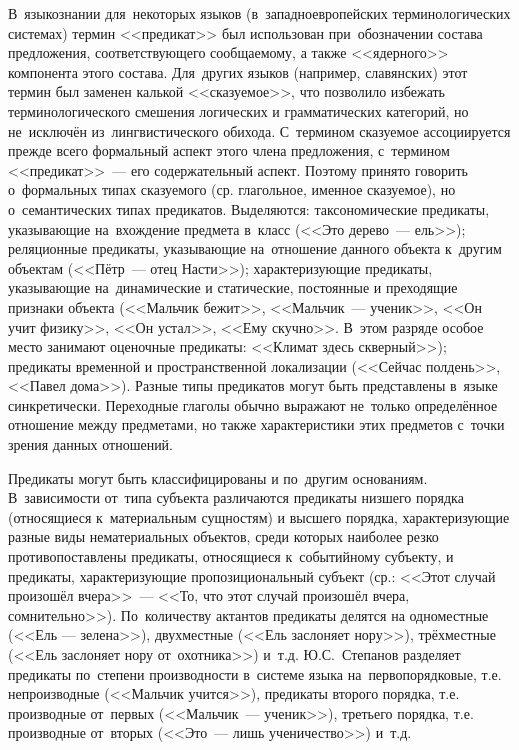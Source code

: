 \documentclass[12pt]{article}
\theoremstyle{definition}
\theoremstyle{remark}
\numberwithin{equation}{section}
\begin{document}
В~языкознании для~некоторых языков (в~западноевропейских терминологических
системах) термин <<предикат>> был использован при~обозначении состава
предложения, соответствующего сообщаемому, а также <<ядерного>> компонента
этого состава. Для~других языков (например, славянских) этот термин был
заменен калькой <<сказуемое>>, что позволило избежать терминологического
смешения логических и грамматических категорий, но не~исключён
из~лингвистического обихода. С~термином сказуемое ассоциируется прежде
всего формальный аспект этого члена предложения, с~термином <<предикат>>~---
его содержательный аспект. Поэтому принято говорить о~формальных типах
сказуемого (ср. глагольное, именное сказуемое), но о~семантических типах
предикатов. Выделяются: таксономические предикаты, указывающие на~вхождение
предмета в~класс (<<Это дерево~--- ель>>); реляционные предикаты,
указывающие на~отношение данного объекта к~другим объектам (<<Пётр~--- отец Насти>>);
характеризующие предикаты, указывающие на~динамические и статические,
постоянные и преходящие признаки объекта (<<Мальчик бежит>>,
<<Мальчик~--- ученик>>, <<Он учит физику>>, <<Он устал>>, <<Ему скучно>>.
В~этом разряде особое место занимают оценочные предикаты: <<Климат
здесь скверный>>); предикаты временной и пространственной локализации
(<<Сейчас полдень>>, <<Павел дома>>). Разные типы предикатов могут быть
представлены в~языке синкретически. Переходные глаголы обычно выражают
не~только определённое отношение между предметами, но также характеристики
этих предметов с~точки зрения данных отношений.

Предикаты могут быть классифицированы и по~другим основаниям. В~зависимости
от~типа субъекта различаются предикаты низшего порядка (относящиеся
к~материальным сущностям) и высшего порядка, характеризующие разные
виды нематериальных объектов, среди которых наиболее резко противопоставлены
предикаты, относящиеся к~событийному субъекту, и предикаты, характеризующие
пропозициональный субъект (ср.: <<Этот случай произошёл вчера>>~---
<<То, что этот случай произошёл вчера, сомнительно>>). По~количеству
актантов предикаты делятся на одноместные (<<Ель — зелена>>),
двухместные (<<Ель заслоняет нору>>), трёхместные (<<Ель заслоняет нору
от~охотника>>) и~т.д. Ю.С.~Степанов разделяет предикаты по~степени
производности в~системе языка на~первопорядковые, т.е. непроизводные
(<<Мальчик учится>>), предикаты второго порядка, т.е. производные
от~первых (<<Мальчик~--- ученик>>), третьего порядка, т.е.
производные от~вторых (<<Это~--- лишь ученичество>>) и~т.д.
\end{document}
